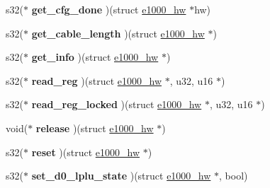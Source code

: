 \begin{DoxyCompactItemize}
\item 
\hypertarget{structe1000__phy__operations_a8df0201e471a6d84bf4ac37c4b6b0de9}{
s32($\ast$ {\bfseries get\_\-cfg\_\-done} )(struct \hyperlink{structe1000__hw}{e1000\_\-hw} $\ast$hw)}
\label{structe1000__phy__operations_a8df0201e471a6d84bf4ac37c4b6b0de9}

\item 
\hypertarget{structe1000__phy__operations_ae2a52d430b5f33c5ff3e2107a04e8e3a}{
s32($\ast$ {\bfseries get\_\-cable\_\-length} )(struct \hyperlink{structe1000__hw}{e1000\_\-hw} $\ast$)}
\label{structe1000__phy__operations_ae2a52d430b5f33c5ff3e2107a04e8e3a}

\item 
\hypertarget{structe1000__phy__operations_a827017b7259904e61429de14ca4d299e}{
s32($\ast$ {\bfseries get\_\-info} )(struct \hyperlink{structe1000__hw}{e1000\_\-hw} $\ast$)}
\label{structe1000__phy__operations_a827017b7259904e61429de14ca4d299e}

\item 
\hypertarget{structe1000__phy__operations_a900e1d2fcd5e98b1831980e129593d7e}{
s32($\ast$ {\bfseries read\_\-reg} )(struct \hyperlink{structe1000__hw}{e1000\_\-hw} $\ast$, u32, u16 $\ast$)}
\label{structe1000__phy__operations_a900e1d2fcd5e98b1831980e129593d7e}

\item 
\hypertarget{structe1000__phy__operations_a7dbbc77b49a4d97519dacbde1c8d9c02}{
s32($\ast$ {\bfseries read\_\-reg\_\-locked} )(struct \hyperlink{structe1000__hw}{e1000\_\-hw} $\ast$, u32, u16 $\ast$)}
\label{structe1000__phy__operations_a7dbbc77b49a4d97519dacbde1c8d9c02}

\item 
\hypertarget{structe1000__phy__operations_abb85b5ca572dd90d9afa0173e049dcd2}{
void($\ast$ {\bfseries release} )(struct \hyperlink{structe1000__hw}{e1000\_\-hw} $\ast$)}
\label{structe1000__phy__operations_abb85b5ca572dd90d9afa0173e049dcd2}

\item 
\hypertarget{structe1000__phy__operations_a0df65b99ce0e92b57a2bbc41f46c8fc7}{
s32($\ast$ {\bfseries reset} )(struct \hyperlink{structe1000__hw}{e1000\_\-hw} $\ast$)}
\label{structe1000__phy__operations_a0df65b99ce0e92b57a2bbc41f46c8fc7}

\item 
\hypertarget{structe1000__phy__operations_a71ce754b5e17e578148e0b3f82c6be4f}{
s32($\ast$ {\bfseries set\_\-d0\_\-lplu\_\-state} )(struct \hyperlink{structe1000__hw}{e1000\_\-hw} $\ast$, bool)}
\label{structe1000__phy__operations_a71ce754b5e17e578148e0b3f82c6be4f}


\end{DoxyCompactItemize}
